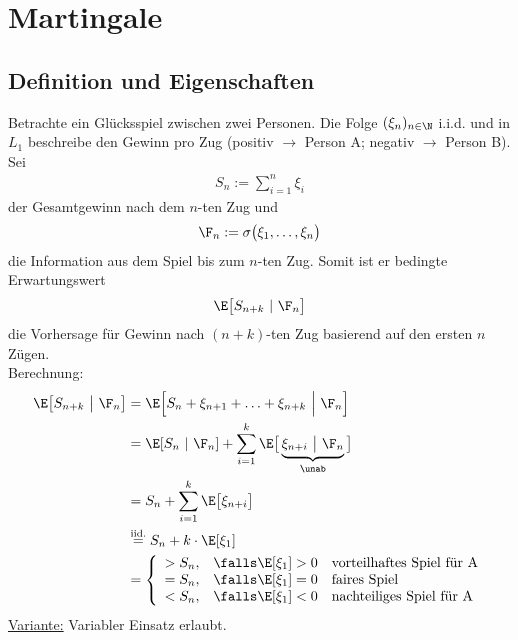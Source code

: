 
\chapter{Martingale} %
\section{Definition und Eigenschaften} %
\begin{beisp}
Betrachte ein Glücksspiel zwischen zwei Personen.
Die Folge $(\xi_n)_{n\in\N}$ i.i.d. und in $L_1$ beschreibe den Gewinn pro Zug (positiv $\to$ Person A; negativ $\to$ Person B). Sei
\begin{align*}
S_n:=\sum\limits_{i=1}^n\xi_i
\end{align*}
der Gesamtgewinn nach dem $n$-ten Zug und 
\begin{align*}
\F_n:=\sigma\big(\xi_1,\ldots,\xi_n\big)
\end{align*}
die Information aus dem Spiel bis zum $n$-ten Zug. Somit ist er bedingte Erwartungswert
\begin{align*}
\E\big[S_{n+k}~|~\F_n\big]
\end{align*}
die Vorhersage für Gewinn nach $(n+k)$-ten Zug basierend auf den ersten $n$ Zügen.\\
Berechnung:
\begin{align*}
\E\big[S_{n+k}~\big|~\F_n\big] 
&=\E\Big[S_n+\xi_{n+1}+\ldots+\xi_{n+k}~\Big|~\F_n\Big]\\
&=\E[S_n~|~\F_n]+\sum\limits_{i=1}^k\E\big[\underbrace{\xi_{n+i}~\big|~\F_n}_{\unab}\big]\\
&=S_n+\sum\limits_{i=1}^k\E\big[\xi_{n+i}\big]\\
&\stackrel{\text{iid.}}{=}S_n+k\cdot\E[\xi_1]\\
&=\left\lbrace\begin{array}{cll}
> S_n, & \falls \E[\xi_1]>0 & \text{vorteilhaftes Spiel für A}\\
= S_n, & \falls \E[\xi_1]=0 & \text{faires Spiel}\\
< S_n, & \falls \E[\xi_1]<0 & \text{nachteiliges Spiel für A}
\end{array}\right.
\end{align*}
\underline{Variante:} Variabler Einsatz erlaubt.

\end{beisp}
